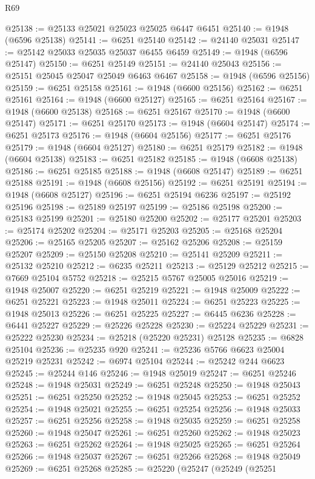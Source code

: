 \begin{lexlean}{R69}
\begin{coremodule}
{@25138 := @25133 @25021 @25023 @25025 @6447 @6451
@25140 := @1948 (@6596 @25138)
@25141 := @6251 @25140
@25142 := @24140 @25031
@25147 := @25142 @25033 @25035 @25037 @6455 @6459
@25149 := @1948 (@6596 @25147)
@25150 := @6251 @25149
@25151 := @24140 @25043
@25156 := @25151 @25045 @25047 @25049 @6463 @6467
@25158 := @1948 (@6596 @25156)
@25159 := @6251 @25158
@25161 := @1948 (@6600 @25156)
@25162 := @6251 @25161
@25164 := @1948 (@6600 @25127)
@25165 := @6251 @25164
@25167 := @1948 (@6600 @25138)
@25168 := @6251 @25167
@25170 := @1948 (@6600 @25147)
@25171 := @6251 @25170
@25173 := @1948 (@6604 @25147)
@25174 := @6251 @25173
@25176 := @1948 (@6604 @25156)
@25177 := @6251 @25176
@25179 := @1948 (@6604 @25127)
@25180 := @6251 @25179
@25182 := @1948 (@6604 @25138)
@25183 := @6251 @25182
@25185 := @1948 (@6608 @25138)
@25186 := @6251 @25185
@25188 := @1948 (@6608 @25147)
@25189 := @6251 @25188
@25191 := @1948 (@6608 @25156)
@25192 := @6251 @25191
@25194 := @1948 (@6608 @25127)
@25196 := @6251 @25194 @6236
@25197 := @25192 @25196
@25198 := @25189 @25197
@25199 := @25186 @25198
@25200 := @25183 @25199
@25201 := @25180 @25200
@25202 := @25177 @25201
@25203 := @25174 @25202
@25204 := @25171 @25203
@25205 := @25168 @25204
@25206 := @25165 @25205
@25207 := @25162 @25206
@25208 := @25159 @25207
@25209 := @25150 @25208
@25210 := @25141 @25209
@25211 := @25132 @25210
@25212 := @6235 @25211
@25213 := @25129 @25212
@25215 := @7669 @25104 @5752
@25218 := @25215 @5767 @25005 @25016
@25219 := @1948 @25007
@25220 := @6251 @25219
@25221 := @1948 @25009
@25222 := @6251 @25221
@25223 := @1948 @25011
@25224 := @6251 @25223
@25225 := @1948 @25013
@25226 := @6251 @25225
@25227 := @6445 @6236
@25228 := @6441 @25227
@25229 := @25226 @25228
@25230 := @25224 @25229
@25231 := @25222 @25230
@25234 := @25218 (@25220 @25231) @25128
@25235 := @6828 @25104
@25236 := @25235 @920
@25241 := @25236 @5766 @6623 @25004 @25219 @25231
@25242 := @6974 @25104
@25244 := @25242 @244 @6623
@25245 := @25244 @146
@25246 := @1948 @25019
@25247 := @6251 @25246
@25248 := @1948 @25031
@25249 := @6251 @25248
@25250 := @1948 @25043
@25251 := @6251 @25250
@25252 := @1948 @25045
@25253 := @6251 @25252
@25254 := @1948 @25021
@25255 := @6251 @25254
@25256 := @1948 @25033
@25257 := @6251 @25256
@25258 := @1948 @25035
@25259 := @6251 @25258
@25260 := @1948 @25047
@25261 := @6251 @25260
@25262 := @1948 @25023
@25263 := @6251 @25262
@25264 := @1948 @25025
@25265 := @6251 @25264
@25266 := @1948 @25037
@25267 := @6251 @25266
@25268 := @1948 @25049
@25269 := @6251 @25268
@25285 := @25220
    (@25247
      (@25249
        (@25251
}
\end{coremodule}
\end{lexlean}
